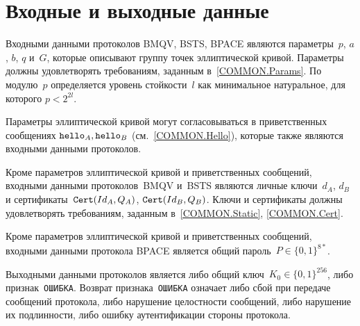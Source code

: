 \section{Входные и выходные данные}\label{INOUT}

Входными данными протоколов BMQV, BSTS, BPACE являются 
параметры~$p$, $a$, $b$, $q$ и~$G$, 
которые описывают группу точек эллиптической кривой. 
Параметры должны удовлетворять требованиям, заданным в~\ref{COMMON.Params}. 
По модулю~$p$ определяется уровень стойкости~$l$ как минимальное 
натуральное, для которого $p<2^{2l}$.

Параметры эллиптической кривой могут согласовываться в 
приветственных сообщениях $\texttt{hello}_A,\texttt{hello}_B$ (см.~\ref{COMMON.Hello}),
которые также являются входными данными протоколов.

Кроме параметров эллиптической кривой и приветственных сообщений, 
входными данными протоколов~BMQV и~BSTS являются личные ключи~$d_A$, $d_B$ 
и сертификаты~$\texttt{Cert}(Id_A,Q_A)$, $\texttt{Cert}(Id_B,Q_B)$.
Ключи и сертификаты должны удовлетворять требованиям, 
заданным в~\ref{COMMON.Static}, \ref{COMMON.Cert}.

Кроме параметров эллиптической кривой и приветственных сообщений, 
входными данными протокола BPACE является общий пароль~$P\in\{0,1\}^{8*}$.

Выходными данными протоколов является либо общий
ключ~$K_0\in\{0,1\}^{256}$, либо признак~\texttt{ОШИБКА}. 
Возврат признака~\texttt{ОШИБКА} означает 
либо сбой при передаче сообщений протокола,
либо нарушение целостности сообщений,
либо нарушение их подлинности,
либо ошибку аутентификации стороны протокола.





